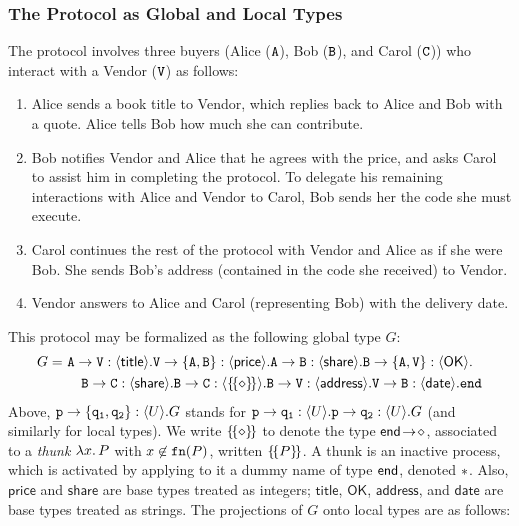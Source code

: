 \documentclass[runningheads,plain]{llncs}
\begin{document}
\subsubsection{The Protocol as Global and Local Types}
The protocol 
involves three buyers (Alice ($\mathtt{A}$), Bob ($\mathtt{B}$), and Carol ($\mathtt{C}$)) who interact with a Vendor ($\mathtt{V}$) as follows:

\begin{enumerate}[1.]
\item Alice sends a book title to Vendor, which replies back to Alice and Bob with a quote. Alice tells Bob how much she can contribute.
\item Bob notifies Vendor and Alice that he agrees with the price, and asks Carol to assist him in completing the protocol. 
To delegate his remaining interactions with Alice and Vendor to Carol, Bob sends her %
the code she must execute.
\item Carol continues the rest of the protocol with Vendor and Alice as if she were Bob. 
She sends Bob's address (contained in the  code she received) to Vendor.
\item Vendor answers to Alice and Carol (representing Bob) with the delivery date.
\end{enumerate}
This protocol may be formalized as the following global type $G$:
\begin{align*}
G = ~&  \mathtt{A}\to\mathtt{\mathtt{V}}:\langle \mathsf{title}\rangle.\mathtt{\mathtt{V}}\to\mathtt{\{A,B\}}:\langle \mathsf{price}\rangle.\mathtt{A}\to\mathtt{B}:\langle \mathsf{share}\rangle.
 \mathtt{B}\to\mathtt{\{A,\mathtt{V}\}}:\langle \mathsf{OK}\rangle.\\
& \quad
 \mathtt{B}\to\mathtt{C}:\langle \mathsf{share}\rangle.\mathtt{B}\to\mathtt{C}:\langle \{\!\{\diamond\}\!\}\rangle.
\mathtt{B}\to\mathtt{\mathtt{V}}:\langle \mathsf{address}\rangle. \mathtt{\mathtt{V}}\to\mathtt{B}:\langle \mathsf{date}\rangle.\mathtt{end}
\end{align*}
Above,  
$\mathtt{\mathtt{p}}\to\mathtt{\{\mathtt{q}_1,\mathtt{q}_2\}}:\langle U\rangle.G$
stands for 
$\mathtt{\mathtt{p}}\to\mathtt{\mathtt{q}_1}:\langle U\rangle.\mathtt{\mathtt{p}}\to\mathtt{\mathtt{q}_2}:\langle U\rangle.G$
(and similarly for local types).
We write $\{\!\{\diamond\}\!\}$ to denote the type $\mathsf{end}\! \rightarrow\! \diamond$, associated to a \emph{thunk} $\lambda x.\,P$ with $x \not \in \mathtt{fn}(P)$, written
$\{\!\{P\}\!\}$. A thunk is an inactive process, which is activated by applying to it a dummy name of type $\mathsf{end}$, denoted $\ast$.
Also, $\mathsf{price}$ and $\mathsf{share}$ are base types treated as integers;
  $\mathsf{title}$, $\mathsf{OK}$, $\mathsf{address}$, and $\mathsf{date}$ are base types treated as strings.
The projections of $G$ onto local types are as follows:
\end{document}
